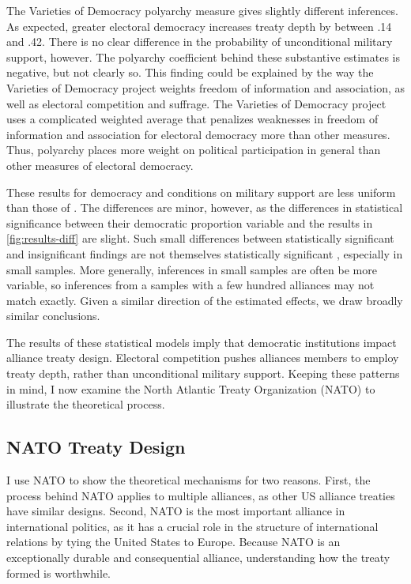 \documentclass[12pt]{article}
\begin{document}
The Varieties of Democracy polyarchy measure gives slightly different inferences. 
As expected, greater electoral democracy increases treaty depth by between .14 and .42. 
There is no clear difference in the probability of unconditional military support, however.
The polyarchy coefficient behind these substantive estimates is negative, but not clearly so.  
This finding could be explained by the way the Varieties of Democracy project weights freedom of information and association, as well as electoral competition and suffrage. 
The Varieties of Democracy project uses a complicated weighted average that penalizes weaknesses in freedom of information and association for electoral democracy more than other measures.
Thus, polyarchy places more weight on political participation in general than other measures of electoral democracy. 


These results for democracy and conditions on military support are less uniform than those of \citet{Chibaetal2015}. 
The differences are minor, however, as the differences in statistical significance between their democratic proportion variable and the results in \autoref{fig:results-diff} are slight. 
Such small differences between statistically significant and insignificant findings are not themselves statistically significant \citep{GelmanStern2006}, especially in small samples. 
More generally, inferences in small samples are often be more variable, so inferences from a samples with a few hundred alliances may not match exactly.
Given a similar direction of the estimated effects, we draw broadly similar conclusions. 


The results of these statistical models imply that democratic institutions impact alliance treaty design. 
Electoral competition pushes alliances members to employ treaty depth, rather than unconditional military support.  
Keeping these patterns in mind, I now examine the North Atlantic Treaty Organization (NATO) to illustrate the theoretical process. 


\subsection{NATO Treaty Design}


I use NATO to show the theoretical mechanisms for two reasons. 
First, the process behind NATO applies to multiple alliances, as other US alliance treaties have similar designs. 
Second, NATO is the most important alliance in international politics, as it has a crucial role in the structure of international relations by tying the United States to Europe. 
Because NATO is an exceptionally durable and consequential alliance, understanding how the treaty formed is worthwhile. 
\end{document}
